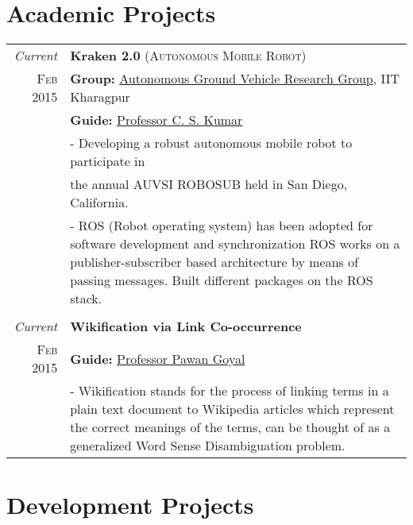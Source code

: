 \documentclass[a4paper,10pt]{article} %
\begin{document}

\section{Academic Projects}

\begin{tabular}{r|p{11cm}}
\emph{Current} & \textbf{Kraken 2.0} \textsc{(Autonomous Mobile Robot)} \\
\textsc{Feb 2015} & \textbf{Group: }\textmd{\href{http://auv-iitkgp.in/}{Autonomous Ground Vehicle Research Group}}, IIT Kharagpur\\
& \textbf{Guide: }\textmd{\href{http://iitkgp.ac.in/fac-profiles/showprofile.php?empcode=aWmdU}{Professor C. S. Kumar}}\\
& \footnotesize{- Developing a robust autonomous mobile robot to participate in}\\
& \footnotesize{ the annual AUVSI ROBOSUB held in San Diego, California.}\\
& \footnotesize{- ROS (Robot operating system) has been adopted for software development and synchronization ROS works on a publisher-subscriber based architecture by means of passing messages. Built different packages on the ROS stack.}\\
\multicolumn{2}{c}{} \\


\emph{Current} & \textbf{Wikiﬁcation via Link Co-occurrence} \\
\textsc{Feb 2015} & \textbf{Guide: }\textmd{\href{http://cse.iitkgp.ac.in/~pawang/}{Professor Pawan Goyal}}\\
& \footnotesize{- Wikiﬁcation stands for the process of linking terms in a plain text document to Wikipedia articles which represent the correct meanings of the terms, can be thought of as a generalized Word Sense Disambiguation problem.}\\
\end{tabular}

\section{Development Projects}
\end{document}

